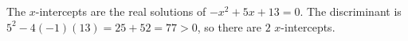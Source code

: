 The $x$-intercepts are the real solutions of $-x^2+5x+13=0$. The discriminant is $5^2-4(-1)(13)=25+52=77>0$, so there are $\boxed{2}$ $x$-intercepts.
